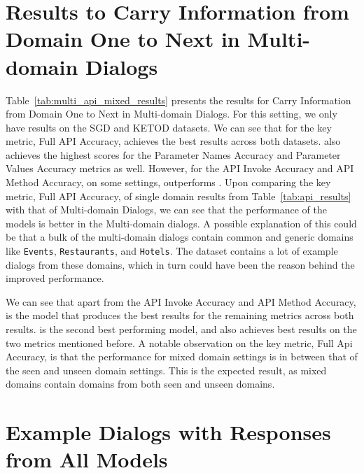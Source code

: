 \section{Results to Carry Information from Domain One to Next in Multi-domain Dialogs}
\label{sec:multi_dom_api}

Table~\ref{tab:multi_api_mixed_results} presents the results for Carry Information from Domain One to Next in Multi-domain Dialogs. 
For this setting, we only have results on the SGD and KETOD datasets. We can see that for the key metric, Full API Accuracy, {\opt} achieves the best results across both datasets. {\opt} also achieves the highest scores for the Parameter Names Accuracy and Parameter Values Accuracy metrics as well. However, for the API Invoke Accuracy and API Method Accuracy, on some settings, {\flan} outperforms {\opt}.
Upon comparing the key metric, Full API Accuracy, of single domain results from Table~\ref{tab:api_results} with that of Multi-domain Dialogs, we can see that the performance of the models is better in the Multi-domain dialogs. A possible explanation of this could be that a bulk of the multi-domain dialogs contain common and generic domains like \texttt{Events}, \texttt{Restaurants}, and \texttt{Hotels}.
The dataset contains a lot of example dialogs from these domains, which in turn could have been the reason behind the improved performance. 

We can see that apart from the API Invoke Accuracy and API Method Accuracy, {\opt} is the model that produces the best results for the remaining metrics across both results. {\flan} is the second best performing model, and also achieves best results on the two metrics mentioned before. A notable observation on the key metric, Full Api Accuracy, is that the performance for mixed domain settings is in between that of the seen and unseen domain settings. This is the expected result, as mixed domains contain domains from both seen and unseen domains.

\section{Example Dialogs with Responses from All Models}
\label{sec:example_dialogs}


